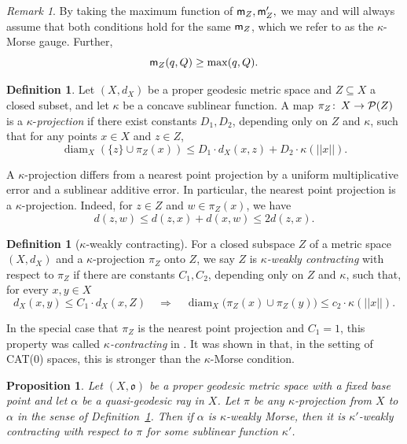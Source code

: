 \documentclass[12 pt]{amsart}
\newcommand{\gothic}{\mathfrak}
\newcommand{\go}{{\gothic o}}
\newtheorem{proposition}[theorem]{Proposition}
\theoremstyle{definition}
\newtheorem{definition}[theorem]{Definition}
\theoremstyle{remark}
\newtheorem{remark}[theorem]{Remark}
\newcommand{\mm}{{\sf m}}
\DeclareMathOperator{\diam}{diam}
\newcommand{\from}{\colon\thinspace}
\begin{document}
\begin{remark}
By taking the maximum function of $\mm_Z, \mm'_Z,$ we may and will always assume that both conditions hold for the same $\mm_Z$, which we refer to as the $\kappa$-Morse gauge. Further,
\begin{equation} 
\mm_Z(q, Q) \geq \max(q, Q). 
\end{equation} 
\end{remark}

\begin{definition} \label{weakprojection}
Let $(X, d_X)$ be a proper geodesic metric space and $Z \subseteq X$ a closed subset, and let 
$\kappa$ be a concave sublinear function. A map $\pi_{Z} \from X \to \mathcal{P}(Z)$ is a $\kappa$-\emph{projection}  if there exist constants $D_{1}, D_{2}$, depending only on $Z$ and $\kappa$, such that for any points $x \in X$ and $z \in Z$, 
\[
\diam_X(\{z \} \cup \pi_{Z}(x)) \leq D_{1} \cdot d_X(x, z) + D_{2} \cdot \kappa(||x||).
\]
\end{definition}

A $\kappa$-projection differs from a nearest point projection by a uniform multiplicative error and a sublinear additive error. In particular, the nearest point projection is a $\kappa$-projection. Indeed, for $z \in Z$ and $w \in \pi_Z(x)$, we have
\[
d(z, w) \leq d(z, x) + d(x, w) \leq 2d(z, x).
\]
\begin{definition}[$\kappa$-weakly contracting] \label{Def:generalContracting}
For a closed subspace $Z$ of a metric space $(X, d_X)$ and a $\kappa$-projection $\pi_Z$ onto $Z$, 
we say $Z$ is \emph{$\kappa$-weakly contracting} with respect to $\pi_Z$ if there are constants $C_{1}, C_{2}$, depending only on $Z$ and $\kappa$, such that, for every 
$x,y \in X$
\[
d_X(x, y) \leq C_{1} \cdot d_X( x, Z) \quad \Longrightarrow \quad
\diam_X \big( \pi_Z(x) \cup  \pi_Z(y)  \big) \leq c_{2} \cdot \kappa(||x||).
\]
\end{definition} 
In the special case that $\pi_Z$ is the nearest point projection and $C_1 = 1$, this property was called $\kappa$\emph{-contracting} in \cite{QRT1}. It was shown in \cite{QRT1} that, in the setting of CAT(0) spaces, this is stronger than the $\kappa$-Morse condition.
\begin{proposition}\cite[Proposition A.6.]{QRT2}\label{contracting}
Let $(X, \go)$ be a proper geodesic metric space with a fixed base point and let $\alpha$ be a quasi-geodesic
ray in $X$. Let $\pi$ be any $\kappa$-projection from $X$ to $\alpha$ in the sense of Definition~\ref{weakprojection}.
Then if $\alpha$ is $\kappa$-weakly Morse, then it is $\kappa'$-weakly contracting with respect to $\pi$ for some sublinear function $\kappa'$.
\end{proposition}
\end{document}

